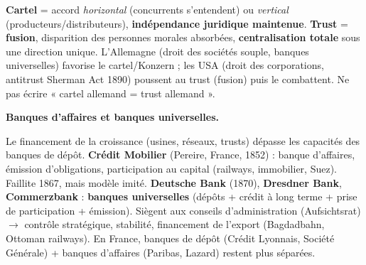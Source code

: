 \documentclass[11pt]{article}
\begin{document}
\begin{attention}
\textbf{Cartel} = accord \emph{horizontal} (concurrents s'entendent) ou \emph{vertical} (producteurs/distributeurs), \textbf{indépendance juridique maintenue}. \textbf{Trust} = \textbf{fusion}, disparition des personnes morales absorbées, \textbf{centralisation totale} sous une direction unique. L'Allemagne (droit des sociétés souple, banques universelles) favorise le cartel/Konzern ; les USA (droit des corporations, antitrust Sherman Act 1890) poussent au trust (fusion) puis le combattent. Ne pas écrire « cartel allemand = trust allemand ».
\end{attention}

\textbf{Banques d'affaires et banques universelles.}\par
Le financement de la croissance (usines, réseaux, trusts) dépasse les capacités des banques de dépôt. \textbf{Crédit Mobilier} (Pereire, France, 1852) : banque d'affaires, émission d'obligations, participation au capital (railways, immobilier, Suez). Faillite 1867, mais modèle imité. \textbf{Deutsche Bank} (1870), \textbf{Dresdner Bank}, \textbf{Commerzbank} : \textbf{banques universelles} (dépôts + crédit à long terme + prise de participation + émission). Siègent aux conseils d'administration (Aufsichtsrat) $\to$ contrôle stratégique, stabilité, financement de l'export (Bagdadbahn, Ottoman railways). En France, banques de dépôt (Crédit Lyonnais, Société Générale) + banques d'affaires (Paribas, Lazard) restent plus séparées.
\end{document}
